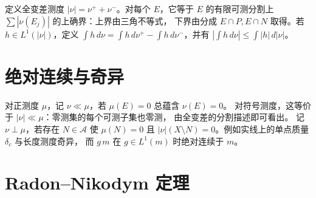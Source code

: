 定义全变差测度 \(|\nu|=\nu^++\nu^-\)。对每个 \(E\)，它等于
\(E\) 的有限可测分割上 \(\sum|\nu(E_j)|\) 的上确界：上界由三角不等式，
下界由分成 \(E\cap P,E\cap N\) 取得。若 \(h\in L^1(|\nu|)\)，定义
\(\int h\,d\nu=\int h\,d\nu^+-\int h\,d\nu^-\)，并有
\(|\int h\,d\nu|\le\int|h|\,d|\nu|\)。

\section{绝对连续与奇异}

对正测度 \(\mu\)，记 \(\nu\ll\mu\)，若 \(\mu(E)=0\) 总蕴含 \(\nu(E)=0\)。
对符号测度，这等价于 \(|\nu|\ll\mu\)：零测集的每个可测子集也零测，
由全变差的分割描述即可看出。
记 \(\nu\perp\mu\)，若存在 \(N\in\mathcal A\) 使 \(\mu(N)=0\) 且
\(|\nu|(X\setminus N)=0\)。例如实线上的单点质量 \(\delta_c\) 与长度测度奇异，
而 \(g\,m\) 在 \(g\in L^1(m)\) 时绝对连续于 \(m\)。

\section{Radon--Nikodym 定理}

